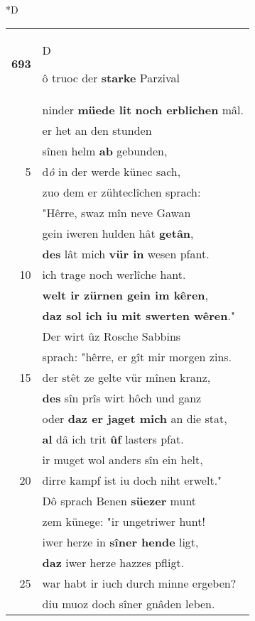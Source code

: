 \documentclass[8pt,a4paper,notitlepage]{article}
\begin{document}
\begin{table}[ht]
\begin{minipage}[t]{0.5\linewidth}
\small
\begin{center}*D
\end{center}
\begin{tabular}{rl}
\textbf{693} & \begin{large}D\end{large}ô truoc der \textbf{starke} Parzival\\ 
 & ninder \textbf{müede lit} \textbf{noch erblichen} mâl.\\ 
 & er het an den stunden\\ 
 & sînen helm \textbf{ab} gebunden,\\ 
5 & d\textit{ô} in der werde künec sach,\\ 
 & zuo dem er zühteclîchen sprach:\\ 
 & "Hêrre, swaz mîn neve Gawan\\ 
 & gein iweren hulden hât \textbf{getân},\\ 
 & \textbf{des} lât mich \textbf{vür in} wesen pfant.\\ 
10 & ich trage noch werlîche hant.\\ 
 & \textbf{welt ir zürnen gein im kêren},\\ 
 & \textbf{daz sol ich iu mit swerten wêren}."\\ 
 & Der wirt ûz Rosche Sabbins\\ 
 & sprach: "hêrre, er gît mir morgen zins.\\ 
15 & der stêt ze gelte vür mînen kranz,\\ 
 & \textbf{des} sîn prîs wirt hôch und ganz\\ 
 & oder \textbf{daz er jaget mich} an die stat,\\ 
 & \textbf{al} dâ ich trit \textbf{ûf} lasters pfat.\\ 
 & ir muget wol anders sîn ein helt,\\ 
20 & dirre kampf ist iu doch niht erwelt."\\ 
 & Dô sprach Benen \textbf{süezer} munt\\ 
 & zem künege: "ir ungetriwer hunt!\\ 
 & iwer herze in \textbf{sîner hende} ligt,\\ 
 & \textbf{daz} iwer herze hazzes pfligt.\\ 
25 & war habt ir iuch durch minne ergeben?\\ 
 & diu muoz doch sîner gnâden leben.\\ 

\end{tabular}
\end{minipage}
\end{table}
\end{document}

